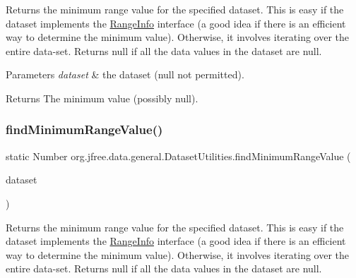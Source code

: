 Returns the minimum range value for the specified dataset. This is easy if the dataset implements the \mbox{\hyperlink{interfaceorg_1_1jfree_1_1data_1_1_range_info}{Range\+Info}} interface (a good idea if there is an efficient way to determine the minimum value). Otherwise, it involves iterating over the entire data-\/set. Returns {\ttfamily null} if all the data values in the dataset are {\ttfamily null}.


\begin{DoxyParams}{Parameters}
{\em dataset} & the dataset ({\ttfamily null} not permitted).\\
\hline
\end{DoxyParams}
\begin{DoxyReturn}{Returns}
The minimum value (possibly {\ttfamily null}). 
\end{DoxyReturn}
\mbox{\label{classorg_1_1jfree_1_1data_1_1general_1_1_dataset_utilities_a176a7f86b58390d92c082d67dbdbb7ad}} 
\subsubsection{\texorpdfstring{find\+Minimum\+Range\+Value()}{findMinimumRangeValue()}\hspace{0.1cm}{\footnotesize\ttfamily [2/2]}}
{\footnotesize\ttfamily static Number org.\+jfree.\+data.\+general.\+Dataset\+Utilities.\+find\+Minimum\+Range\+Value (\begin{DoxyParamCaption}\item[{\mbox{\hyperlink{interfaceorg_1_1jfree_1_1data_1_1xy_1_1_x_y_dataset}{X\+Y\+Dataset}}}]{dataset }\end{DoxyParamCaption})\hspace{0.3cm}{\ttfamily [static]}}

Returns the minimum range value for the specified dataset. This is easy if the dataset implements the \mbox{\hyperlink{interfaceorg_1_1jfree_1_1data_1_1_range_info}{Range\+Info}} interface (a good idea if there is an efficient way to determine the minimum value). Otherwise, it involves iterating over the entire data-\/set. Returns {\ttfamily null} if all the data values in the dataset are {\ttfamily null}.


